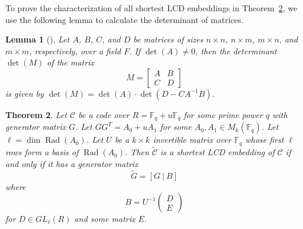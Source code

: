 \documentclass{article}
\newtheorem{theorem}{Theorem}[section]
\newtheorem{lemma}[theorem]{Lemma}
\theoremstyle{definition}
\theoremstyle{remark}
\begin{document}
To prove the characterization of all shortest LCD embeddings in Theorem~\ref{LCD_class}, we use the following lemma to calculate the determinant of matrices.
\begin{lemma}[\cite{ZS-2006}]\label{Schur_lemma}
Let $A$, $B$, $C$, and $D$ be matrices of sizes $n\times n$, $n\times m$, $m\times n$, and $m\times m$, respectively, over a field $F$. If $\det(A)\ne 0$, then the determinant $\det(M)$ of the matrix
\[
M=\begin{bmatrix}
    A & B\\C & D
\end{bmatrix}
\]
is given by $\det (M)=\det (A)\cdot \det(D-CA^{-1}B)$.
\end{lemma}

\begin{theorem}\label{LCD_class}
    Let $\mathcal{C}$ be a code over $R=\mathbb{F}_q+u\mathbb{F}_q$ for some prime power $q$ with generator matrix $G$. Let $GG^T=A_0+uA_1$ for some $A_0, A_1\in M_k(\mathbb{F}_q)$. Let $\ell=\dim\operatorname{Rad}(A_0)$. Let $U$ be a $k\times k$ invertible matrix over $\mathbb{F}_q$ whose first $\ell$ rows form a basis of $\operatorname{Rad}(A_0)$. Then $\tilde{\mathcal{C}}$ is a shortest LCD embedding of $\mathcal{C}$ if and only if it has a generator matrix
    \[
    \tilde{G}=[G~|~B]
    \]
    where
    \[
    B=U^{-1}\begin{pmatrix}
        D\\E
    \end{pmatrix}
    \]
    for $D\in GL_\ell(R)$ and some matrix $E$.
\end{theorem}
\end{document}
